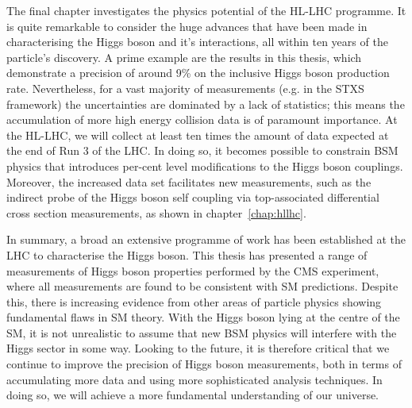 The final chapter investigates the physics potential of the HL-LHC programme. It is quite remarkable to consider the huge advances that have been made in characterising the Higgs boson and it's interactions, all within ten years of the particle's discovery. A prime example are the \Hgg results in this thesis, which demonstrate a precision of around 9\% on the inclusive Higgs boson production rate. Nevertheless, for a vast majority of measurements (e.g. in the STXS framework) the uncertainties are dominated by a lack of statistics; this means the accumulation of more high energy collision data is of paramount importance. At the HL-LHC, we will collect at least ten times the amount of data expected at the end of Run 3 of the LHC. In doing so, it becomes possible to constrain BSM physics that introduces per-cent level modifications to the Higgs boson couplings. Moreover, the increased data set facilitates new measurements, such as the indirect probe of the Higgs boson self coupling via top-associated differential cross section measurements, as shown in chapter~\ref{chap:hllhc}.

In summary, a broad an extensive programme of work has been established at the LHC to characterise the Higgs boson. This thesis has presented a range of measurements of Higgs boson properties performed by the CMS experiment, where all measurements are found to be consistent with SM predictions. Despite this, there is increasing evidence from other areas of particle physics showing fundamental flaws in SM theory. With the Higgs boson lying at the centre of the SM, it is not unrealistic to assume that new BSM physics will interfere with the Higgs sector in some way. Looking to the future, it is therefore critical that we continue to improve the precision of Higgs boson measurements, both in terms of accumulating more data and using more sophisticated analysis techniques. In doing so, we will achieve a more fundamental understanding of our universe.